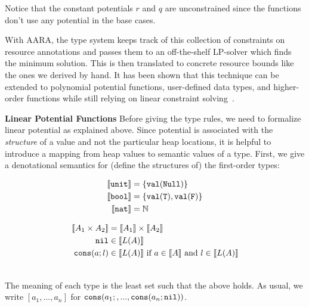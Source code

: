 \documentclass{easychair}
\newcommand{\irl}[1]{\mathtt{#1}}
\newcounter{rule}
\newcommand{\denote}[1]{\llbracket#1\rrbracket}
\newcommand{\val}[1]{\irl{val}(#1)}
\theoremstyle{definition}
\begin{document}
Notice that the constant potentials $r$ and $q$ are unconstrained since the functions don't
use any potential in the base cases.

With AARA, the type system keeps track of this collection of constraints on
resource annotations and passes them to an off-the-shelf LP-solver 
which finds the minimum solution. This is then translated to concrete resource bounds
like the ones we derived by hand. It has been shown that this technique can be extended
to polynomial potential functions, user-defined data types, and higher-order functions while
still relying on linear constraint solving~\cite{HoffmannAH10,HoffmannW15}.
%

\textbf{Linear Potential Functions}\label{sect:lfp}
Before giving the type rules, we need to formalize linear potential as explained above.
Since potential is associated with the \emph{structure} of a value and not the particular heap 
locations, it is helpful to introduce a mapping from
heap values to semantic values of a type. 
First, we give a denotational semantics for (define the structures of) the first-order types: 
  \begin{minipage}{0.4\linewidth}
\begin{align*}
	\denote{\unittyabt} &= \{\val{\irl{Null}}\}\\
	\denote{\booltyabt} &= \{\val{\irl{T}}, \val{\irl{F}}\}\\
	\denote{\irl{nat}} &= \mathbb{N}\\
\end{align*}
  \end{minipage}%
\begin{minipage}{0.6\linewidth}
\begin{align*}
\denote{\prodtycst{A_1}{A_2}} &= \denote{A_1} \times \denote{A_2}\\
\nilexcst &\in \denote{L(A)}\\
\consexcst{a}{l} &\in \denote{L(A)} \text{ if } a \in \denote{A} \text{ and } l \in \denote{L(A)}\\
\end{align*}
  \end{minipage}\\
The meaning of each type is the least set such that the above holds. As usual, we write $[a_1,...,a_n]$ for ${\mathtt{cons}}\mathtt{(}{a_1;,...,{\mathtt{cons}}\mathtt{(}{a_n;\mathtt{nil}}\mathtt{)}}\mathtt{)}$.
\end{document}
